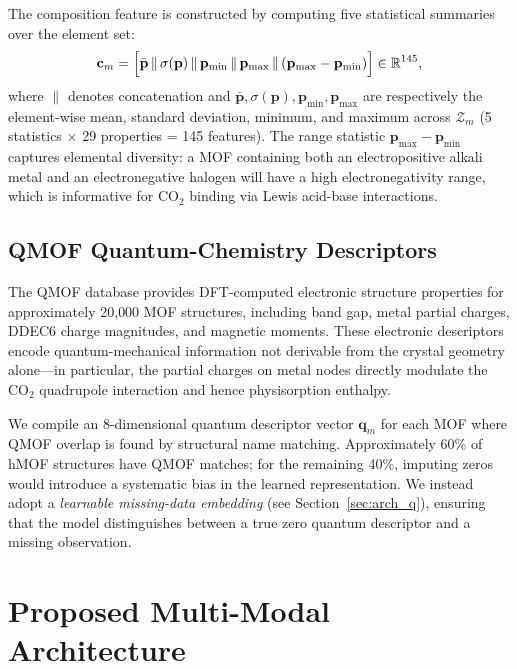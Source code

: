 \documentclass[conference]{IEEEtran}
\begin{document}
The composition feature is constructed by computing five statistical
summaries over the element set:
\begin{equation}
  \mathbf{c}_{m}
  =\Bigl[
     \bar{\mathbf{p}}\,\|\,
     \sigma(\mathbf{p})\,\|\,
     \mathbf{p}_{\min}\,\|\,
     \mathbf{p}_{\max}\,\|\,
     (\mathbf{p}_{\max}-\mathbf{p}_{\min})
   \Bigr]
  \in\mathbb{R}^{145},
  \label{eq:magpie}
\end{equation}
where $\|$ denotes concatenation and $\bar{\mathbf{p}}, \sigma(\mathbf{p}),
\mathbf{p}_{\min}, \mathbf{p}_{\max}$ are respectively the element-wise
mean, standard deviation, minimum, and maximum across $\mathcal{Z}_m$
(5 statistics $\times$ 29 properties = 145 features).
The range statistic $\mathbf{p}_{\max}-\mathbf{p}_{\min}$ captures
elemental diversity: a MOF containing both an electropositive alkali metal
and an electronegative halogen will have a high electronegativity range,
which is informative for CO$_2$ binding via Lewis acid-base interactions.

\subsection{QMOF Quantum-Chemistry Descriptors}
\label{sec:qmof}

The QMOF database \cite{qmof2021} provides DFT-computed electronic structure
properties for approximately 20{,}000 MOF structures, including band gap,
metal partial charges, DDEC6 charge magnitudes, and magnetic moments.  These
electronic descriptors encode quantum-mechanical information not derivable
from the crystal geometry alone—in particular, the partial charges on metal
nodes directly modulate the CO$_2$ quadrupole interaction and hence
physisorption enthalpy.

We compile an 8-dimensional quantum descriptor vector $\mathbf{q}_m$ for
each MOF where QMOF overlap is found by structural name matching.
Approximately 60\% of hMOF structures have QMOF matches; for the remaining
40\%, imputing zeros would introduce a systematic bias in the learned
representation.  We instead adopt a \emph{learnable missing-data embedding}
(see Section~\ref{sec:arch_q}), ensuring that the model distinguishes between
a true zero quantum descriptor and a missing observation.

\section{Proposed Multi-Modal Architecture}
\label{sec:arch}
\end{document}
